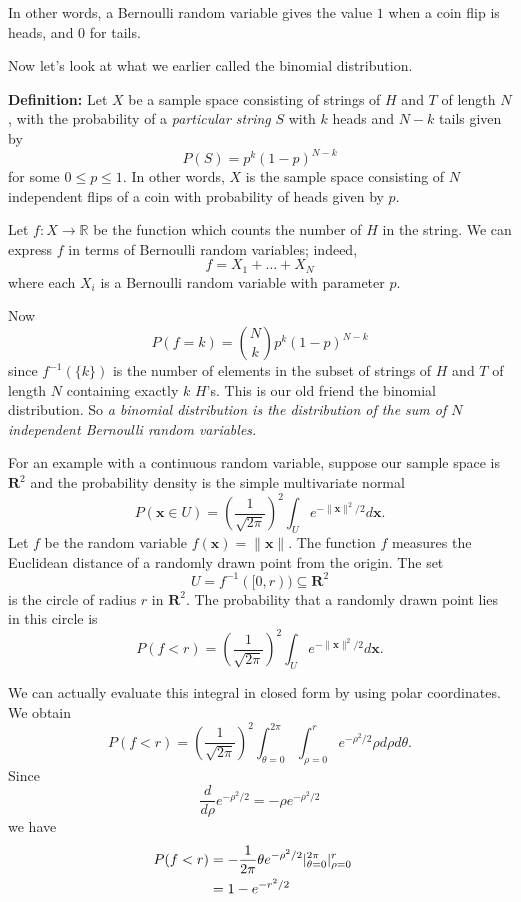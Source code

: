 \documentclass[
]{article}
\begin{document}
In other words, a Bernoulli random variable gives the value \(1\) when a
coin flip is heads, and \(0\) for tails.

Now let's look at what we earlier called the binomial distribution.

\textbf{Definition:} Let \(X\) be a sample space consisting of strings
of \(H\) and \(T\) of length \(N\), with the probability of a
\emph{particular string} \(S\) with \(k\) heads and \(N-k\) tails given
by \[
P(S)=p^{k}(1-p)^{N-k}
\] for some \(0\le p\le 1\). In other words, \(X\) is the sample space
consisting of \(N\) independent flips of a coin with probability of
heads given by \(p\).

Let \(f:X\to \mathbb{R}\) be the function which counts the number of
\(H\) in the string. We can express \(f\) in terms of Bernoulli random
variables; indeed, \[
f=X_1+\ldots+X_N
\] where each \(X_i\) is a Bernoulli random variable with parameter
\(p\).

Now \[
P(f=k) = \binom{N}{k}p^{k}(1-p)^{N-k}
\] since \(f^{-1}(\{k\})\) is the number of elements in the subset of
strings of \(H\) and \(T\) of length \(N\) containing exactly \(k\)
\(H\)'s. This is our old friend the binomial distribution. So \emph{a
binomial distribution is the distribution of the sum of \(N\)
independent Bernoulli random variables.}

For an example with a continuous random variable, suppose our sample
space is \(\mathbf{R}^{2}\) and the probability density is the simple
multivariate normal \[
P(\mathbf{x}\in U) = \left(\frac{1}{\sqrt{2\pi}}\right)^2\int_{U} e^{-\|\mathbf{x}\|^2/2} d\mathbf{x}.
\] Let \(f\) be the random variable \(f(\mathbf{x})=\|\mathbf{x}\|\).
The function \(f\) measures the Euclidean distance of a randomly drawn
point from the origin. The set
\[U=f^{-1}([0,r))\subseteq\mathbf{R}^{2}\] is the circle of radius \(r\)
in \(\mathbf{R}^{2}\). The probability that a randomly drawn point lies
in this circle is \[
P(f<r) = \left(\frac{1}{\sqrt{2\pi}}\right)^2\int_{U} e^{-\|\mathbf{x}\|^2/2} d\mathbf{x}.
\]

We can actually evaluate this integral in closed form by using polar
coordinates. We obtain \[
P(f<r) = \left(\frac{1}{\sqrt{2\pi}}\right)^2\int_{\theta=0}^{2\pi}\int_{\rho=0}^{r} e^{-\rho^2/2}\rho d\rho d\theta.
\] Since \[
\frac{d}{d\rho}e^{-\rho^2/2}=-\rho e^{-\rho^2/2}
\] we have \begin{align*}
P(f<r)&=-\frac{1}{2\pi}\theta e^{-\rho^2/2}|_{\theta=0}^{2\pi}|_{\rho=0}^{r}\cr
&=1-e^{-r^2/2}\cr
\end{align*}
\end{document}
